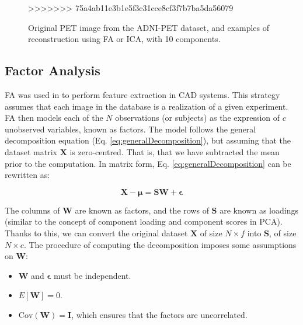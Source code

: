 \begin{figure}[bth]
>>>>>>> 75a4ab11e3b1e5f3c31cce8cf3f7b7ba5da56079
	\caption[Original PET image and its reconstruction using FA or ICA.]{Original PET image from the ADNI-PET dataset, and examples of reconstruction using \ac{FA} or \ac{ICA}, with 10 components.}\label{fig:comparisonReconstructions}
\end{figure}


\subsection{Factor Analysis}
\acf{FA} was used in \cite{Martinez201141,Martinez-Murcia20129676} to perform feature extraction in \ac{CAD} systems. This strategy assumes that each image in the database is a realization of a given experiment. \ac{FA} then models each of the $N$ observations (or subjects) as the expression of $c$ unobserved variables, known as factors. The model follows the general decomposition equation (Eq. \ref{eq:generalDecomposition}), but assuming that the dataset matrix $\mathbf{X}$ is zero-centred. That is, that we have subtracted the mean prior to the computation. In matrix form, Eq. \ref{eq:generalDecomposition} can be rewritten as:

\begin{equation}\label{eq:factoranalysis}
\mathbf{X} -\boldsymbol{\mu}= \mathbf{S}\mathbf{W} +  \boldsymbol{\epsilon}
\end{equation}

The columns of $\mathbf{W}$ are known as factors, and the rows of $\mathbf{S}$ are known as loadings  (similar to the concept of component loading and component scores in \ac{PCA}). Thanks to this, we can convert the original dataset $\mathbf{X}$ of size $N\times f$ into $\mathbf{S}$, of size $N\times c$. The procedure of computing the decomposition imposes some assumptions on $\mathbf{W}$: 
\begin{itemize}
	\item $\mathbf{W}$ and $\boldsymbol{\epsilon}$ must be independent. 
	\item $E[\mathbf{W}] = 0$. 
	\item $\text{Cov}(\mathbf{W}) = \mathbf{I}$, which ensures that the factors are uncorrelated. 
\end{itemize}

